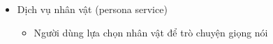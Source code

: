 

\begin{itemize}


\item Dịch vụ nhân vật (persona service)
\begin{itemize}
\item Người dùng lựa chọn nhân vật để trò chuyện giọng nói
\end{itemize}


\end{itemize}

